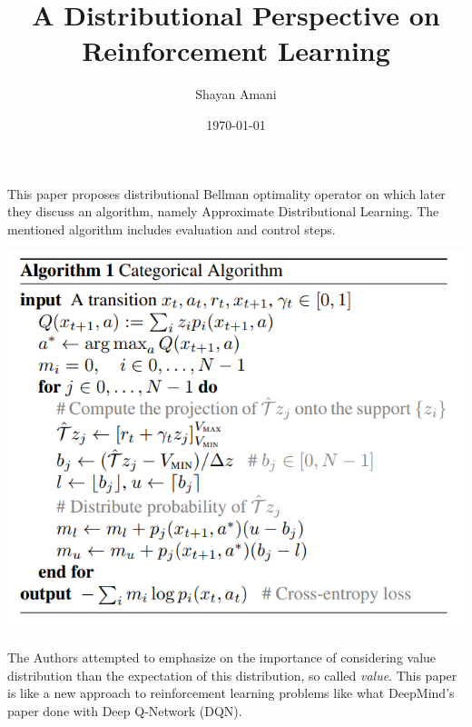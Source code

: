 \documentclass[a4paper,12pt]{article}
\title{A Distributional Perspective on Reinforcement Learning}
\author{Shayan Amani}
\date{\today}
\begin{document}
\maketitle

This paper proposes distributional Bellman optimality operator on which later they discuss an algorithm, namely Approximate Distributional Learning. The mentioned algorithm includes evaluation and control steps. 

 \includegraphics[width=1\columnwidth]{alg1.png}


The Authors attempted to emphasize on the importance of considering value distribution than the expectation of this distribution, so called \textit{value}. This paper is like a new approach to reinforcement learning problems like what DeepMind's paper done with Deep Q-Network (DQN).








\end{document}
